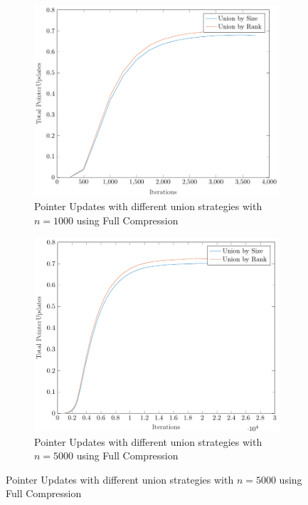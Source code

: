 \begin{figure}[ht]
    \centering
    \begin{subfigure}{0.32\textwidth}
        \centering
        \includegraphics[width=\textwidth]{../images/plotFCNonFull1000_PointerUpdates.pdf}
        \caption{Pointer Updates with different union strategies with $n = 1000$ using Full Compression}
    \end{subfigure}%
    \hfill
    \begin{subfigure}{0.32\textwidth}
        \centering
        \includegraphics[width=\textwidth]{../images/plotFCNonFull5000_PointerUpdates.pdf}
        \caption{Pointer Updates with different union strategies with $n = 5000$ using Full Compression}

\end{subfigure}
\end{figure}
